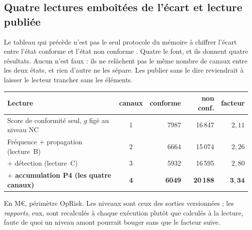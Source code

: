 \subsection*{Quatre lectures emboîtées de l'écart et lecture publiée}

Le tableau qui précède n'est pas le seul protocole du mémoire à chiffrer \og l'écart entre l'état
conforme et l'état non conforme \fg{}. Quatre le font, et ils donnent quatre résultats. Aucun
n'est faux : ils ne relâchent pas le même nombre de canaux entre les deux états, et rien
d'autre ne les sépare. Les publier sans le dire reviendrait à laisser le lecteur trancher sans les éléments.

\begin{center}\footnotesize
\renewcommand{\arraystretch}{1.25}
\begin{tabular}{@{}l c r r r@{}}
\toprule
\textbf{Lecture} & \textbf{canaux} & \textbf{conforme} & \textbf{non conf.} & \textbf{facteur} \\
\midrule
Score de conformité seul, $g$ figé au niveau NC & 1 & 7987 & 16\,847 & $2{,}11$ \\
Fréquence $+$ propagation (lecture~B) & 2 & 6664 & 15\,074 & $2{,}26$ \\
$+$ détection (lecture~C) & 3 & 5932 & 16\,595 & $2{,}80$ \\
\textbf{$+$ accumulation P4 (les quatre canaux)} & \textbf{4} & \textbf{6049} & \textbf{20\,188}
& $\mathbf{3{,}34}$ \\
\bottomrule
\end{tabular}
\end{center}

\vspace{4pt}
\noindent En M\euro, périmètre OpRisk. Les niveaux sont ceux des sorties versionnées ; les
\emph{rapports}, eux, sont recalculés à chaque exécution plutôt que
calculés à la lecture, faute de quoi un niveau amont pourrait bouger sans que le facteur suive.

